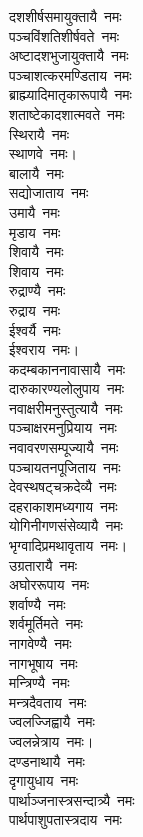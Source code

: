 \begin{multicols}{2}
\begin{flushleft}
दशशीर्षसमायुक्तायै~नमः\\
पञ्चविंशतिशीर्षवते~नमः\\
अष्टादशभुजायुक्तायै~नमः\\
पञ्चाशत्करमण्डिताय~नमः\\
ब्राह्म्यादिमातृकारूपायै~नमः\\
शताष्टेकादशात्मवते~नमः\\
स्थिरायै~नमः\\
स्थाणवे~नमः।\hfill{}\\
बालायै~नमः\\
सद्योजाताय~नमः\\
उमायै~नमः\\
मृडाय~नमः\\
शिवायै~नमः\\
शिवाय~नमः\\
रुद्राण्यै~नमः\\
रुद्राय~नमः\\
ईश्वर्यै~नमः\\
ईश्वराय~नमः।\hfill{}\\
कदम्बकाननावासायै~नमः\\
दारुकारण्यलोलुपाय~नमः\\
नवाक्षरीमनुस्तुत्यायै~नमः\\
पञ्चाक्षरमनुप्रियाय~नमः\\
नवावरणसम्पूज्यायै~नमः\\
पञ्चायतनपूजिताय~नमः\\
देवस्थषट्चक्रदेव्यै~नमः\\
दहराकाशमध्यगाय~नमः\\
योगिनीगणसंसेव्यायै~नमः\\
भृग्वादिप्रमथावृताय~नमः।\hfill{}\\
उग्रतारायै~नमः\\
अघोररूपाय~नमः\\
शर्वाण्यै~नमः\\
शर्वमूर्तिमते~नमः\\
नागवेण्यै~नमः\\
नागभूषाय~नमः\\
मन्त्रिण्यै~नमः\\
मन्त्रदैवताय~नमः\\
ज्वलज्जिह्वायै~नमः\\
ज्वलन्नेत्राय~नमः।\hfill{}\\
दण्डनाथायै~नमः\\
दृगायुधाय~नमः\\
पार्थाञ्जनास्त्रसन्दात्र्यै~नमः\\
पार्थपाशुपतास्त्रदाय~नमः\\

\end{flushleft}
\end{multicols}
